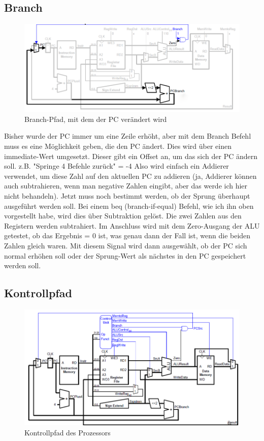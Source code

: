 \documentclass[12pt, a4paper]{article}
\begin{document}
\subsection{Branch}
\begin{figure}[H]
	\begin{center}
		\includegraphics [width=17cm]{Prozessor7.png}
	\end{center}
	\caption{Branch-Pfad, mit dem der PC verändert wird}
\end{figure}

Bisher wurde der PC immer um eine Zeile erhöht, aber mit dem Branch Befehl muss es eine Möglichkeit geben, die den PC ändert. Dies wird über einen immediate-Wert umgesetzt. Dieser gibt ein Offset an, um das sich der PC ändern soll. z.B. "Springe 4 Befehle zurück" = -4 Also wird einfach ein Addierer verwendet, um diese Zahl auf den aktuellen PC zu addieren (ja, Addierer können auch subtrahieren, wenn man negative Zahlen eingibt, aber das werde ich hier nicht behandeln). Jetzt muss noch bestimmt werden, ob der Sprung überhaupt ausgeführt werden soll. Bei einem beq (branch-if-equal) Befehl, wie ich ihn oben vorgestellt habe, wird dies über Subtraktion gelöst. Die zwei Zahlen aus den Registern werden subtrahiert. Im Anschluss wird mit dem Zero-Ausgang der ALU getestet, ob das Ergebnis = 0 ist, was genau dann der Fall ist, wenn die beiden Zahlen gleich waren. Mit diesem Signal wird dann ausgewählt, ob der PC sich normal erhöhen	soll oder der Sprung-Wert als nächstes in den PC gespeichert werden soll.

\subsection{Kontrollpfad}
\begin{figure}[H]
	\begin{center}
		\includegraphics [width=17cm]{Prozessor8.png}
	\end{center}
	\caption{Kontrollpfad des Prozessors}
\end{figure}
\end{document}
